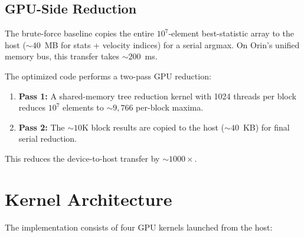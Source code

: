 \documentclass[11pt,letterpaper]{article}
\begin{document}
\subsection{GPU-Side Reduction}
\label{sec:reduction}

The brute-force baseline copies the entire $10^7$-element best-statistic
array to the host (${\sim}40$~MB for stats + velocity indices) for a
serial argmax. On Orin's unified memory bus, this transfer takes
${\sim}200$~ms.

The optimized code performs a two-pass GPU reduction:
\begin{enumerate}[nosep]
    \item \textbf{Pass 1:} A shared-memory tree reduction kernel with 1024
          threads per block reduces $10^7$ elements to ${\sim}9{,}766$
          per-block maxima.
    \item \textbf{Pass 2:} The ${\sim}10$K block results are copied to
          the host (${\sim}40$~KB) for final serial reduction.
\end{enumerate}

This reduces the device-to-host transfer by ${\sim}1000\times$.


\section{Kernel Architecture}
\label{sec:kernels}

The implementation consists of four GPU kernels launched from the host:
\end{document}
